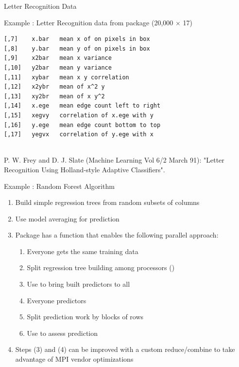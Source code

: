 \begin{frame}[fragile]{Letter Recognition Data}
\begin{exampleblock}{Example \countex : Letter Recognition data from
      package  (20,000 $\times$ 17)}
\begin{minipage}{0.69\textwidth}
\begin{lstlisting}
[,7]	x.bar	mean x of on pixels in box
[,8]	y.bar	mean y of on pixels in box
[,9]	x2bar	mean x variance
[,10]	y2bar	mean y variance
[,11]	xybar	mean x y correlation
[,12]	x2ybr	mean of x^2 y
[,13]	xy2br	mean of x y^2
[,14]	x.ege	mean edge count left to right
[,15]	xegvy	correlation of x.ege with y
[,16]	y.ege	mean edge count bottom to top
[,17]	yegvx	correlation of y.ege with x
      \end{lstlisting}
    \end{minipage} \\
    {\tiny P. W. Frey and D. J. Slate (Machine Learning Vol 6/2 March 91):
    "Letter Recognition Using Holland-style Adaptive Classifiers".}
  \end{exampleblock}
\end{frame}


\begin{frame}
  \begin{exampleblock}{Example \showex : Random Forest Algorithm}\pause
    \begin{enumerate}
     \item Build simple regression trees from random subsets of
       columns
     \item Use model averaging for prediction
     \item Package  has a  function
       that enables the following parallel approach:
       \begin{enumerate}
       \item Everyone gets the same training data
       \item Split regression tree building among processors
         ()
       \item Use  to bring built predictors to all
       \item Everyone  predictors
       \item Split prediction work by blocks of rows
       \item Use  to assess prediction
       \end{enumerate}
     \item Steps (3) and (4) can be improved with a custom
       reduce/combine to take advantage of MPI vendor optimizations
    \end{enumerate}
  \end{exampleblock}
\end{frame}


